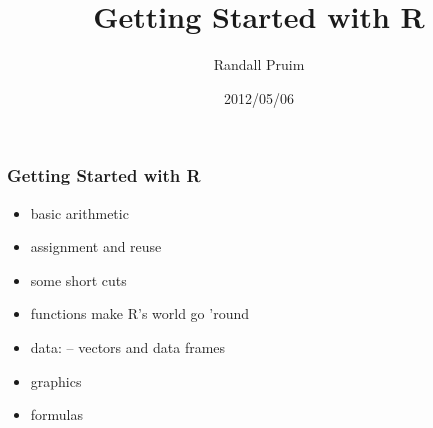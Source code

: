 \documentclass[ignorenonframetext,]{beamer}
\title{Getting Started with R}
\author{Randall Pruim}
\date{2012/05/06}
\begin{document}
\frame{\titlepage}

\begin{frame}\frametitle{Getting Started with R}

\begin{itemize}[<+->]
\item
  basic arithmetic
\item
  assignment and reuse
\item
  some short cuts
\item
  functions make R's world go 'round
\item
  data: -- vectors and data frames
\item
  graphics
\item
  formulas
\end{itemize}

\end{frame}
\end{document}
